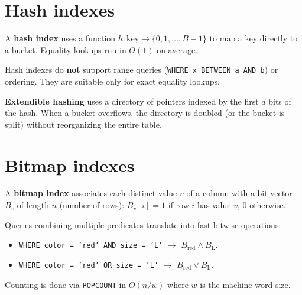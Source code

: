 \section{Hash indexes}

\begin{definition}
A \textbf{hash index} uses a function $h : \text{key} \to \{0, 1, \ldots,
B-1\}$ to map a key directly to a bucket. Equality lookups run in $O(1)$
on average.
\end{definition}

\begin{remark}
Hash indexes do \textbf{not} support range queries
(\texttt{WHERE x BETWEEN a AND b}) or ordering. They are suitable only
for exact equality lookups.
\end{remark}

\begin{definition}
\textbf{Extendible hashing} uses a directory of pointers indexed by the
first $d$ bits of the hash. When a bucket overflows, the directory is
doubled (or the bucket is split) without reorganizing the entire table.
\end{definition}

\section{Bitmap indexes}

\begin{definition}
A \textbf{bitmap index} associates each distinct value $v$ of a column
with a bit vector $B_v$ of length $n$ (number of rows):
$B_v[i] = 1$ if row $i$ has value $v$, 0 otherwise.
\end{definition}

\begin{proposition}
Queries combining multiple predicates translate into fast bitwise
operations:
\begin{itemize}
  \item \texttt{WHERE color = 'red' AND size = 'L'} $\to$ $B_{\text{red}} \wedge B_{\text{L}}$.
  \item \texttt{WHERE color = 'red' OR size = 'L'} $\to$ $B_{\text{red}} \vee B_{\text{L}}$.
\end{itemize}
Counting is done via \texttt{POPCOUNT} in $O(n/w)$ where $w$ is the
machine word size.
\end{proposition}


